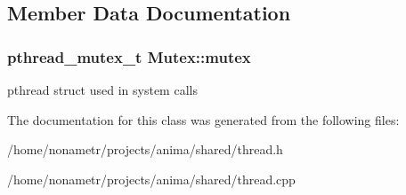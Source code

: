 \subsection{Member Data Documentation}
\hypertarget{classMutex_a8feb0b01916c1feedd1f0c0dcd74081b}{
\subsubsection[{mutex}]{\setlength{\rightskip}{0pt plus 5cm}pthread\_\-mutex\_\-t {\bf Mutex::mutex}}}
\label{classMutex_a8feb0b01916c1feedd1f0c0dcd74081b}
pthread struct used in system calls 

The documentation for this class was generated from the following files:\begin{DoxyCompactItemize}
\item 
/home/nonametr/projects/anima/shared/thread.h\item 
/home/nonametr/projects/anima/shared/thread.cpp\end{DoxyCompactItemize}
